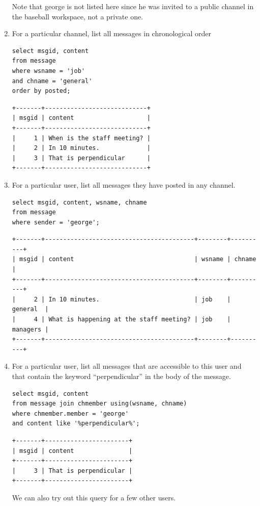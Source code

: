 \documentclass{article}
\begin{document}
\begin{enumerate}
Note that george is not listed here since he was invited to a public channel in the baseball workspace, not a private one.

\item
For a particular channel, list all messages in chronological order
\begin{lstlisting}
select msgid, content
from message
where wsname = 'job'
and chname = 'general'
order by posted;
\end{lstlisting}
\begin{verbatim}
+-------+----------------------------+
| msgid | content                    |
+-------+----------------------------+
|     1 | When is the staff meeting? |
|     2 | In 10 minutes.             |
|     3 | That is perpendicular      |
+-------+----------------------------+
\end{verbatim}

\item
For a particular user, list all messages they have posted in any channel.
\begin{lstlisting}
select msgid, content, wsname, chname
from message
where sender = 'george';
\end{lstlisting}
\begin{verbatim}
+-------+-----------------------------------------+--------+----------+
| msgid | content                                 | wsname | chname   |
+-------+-----------------------------------------+--------+----------+
|     2 | In 10 minutes.                          | job    | general  |
|     4 | What is happening at the staff meeting? | job    | managers |
+-------+-----------------------------------------+--------+----------+
\end{verbatim}

\item
For a particular user, list all messages that are accessible to this user and that contain the keyword “perpendicular” in the body of the message.
\begin{lstlisting}
select msgid, content
from message join chmember using(wsname, chname)
where chmember.member = 'george'
and content like '%perpendicular%';
\end{lstlisting}
\begin{verbatim}
+-------+-----------------------+
| msgid | content               |
+-------+-----------------------+
|     3 | That is perpendicular |
+-------+-----------------------+
\end{verbatim}

We can also try out this query for a few other users.


\end{enumerate}
\end{document}
